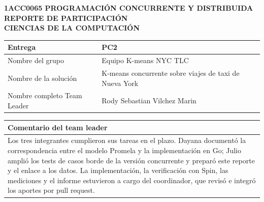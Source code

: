 \documentclass[11pt,a4paper]{article}
\newcommand{\nombreGrupo}{Equipo K-means NYC TLC}
\begin{document}
\begin{center}
\textbf{1ACC0065 PROGRAMACIÓN CONCURRENTE Y DISTRIBUIDA}\\[3pt]
\textbf{REPORTE DE PARTICIPACIÓN}\\[3pt]
\textbf{CIENCIAS DE LA COMPUTACIÓN}
\end{center}

\begin{tabularx}{\textwidth}{|L{5cm}|Y|}\hline
Entrega & PC2 \\\hline
Nombre del grupo & \nombreGrupo \\\hline
Nombre de la solución & K-means concurrente sobre viajes de taxi de Nueva York \\\hline
Nombre completo Team Leader & Rody Sebastian Vilchez Marin \\\hline
\end{tabularx}

\vspace{6pt}
\begin{tabularx}{\textwidth}{|Y|}\hline
\textbf{Comentario del team leader} \\\hline
Los tres integrantes cumplieron sus tareas en el plazo. Dayana documentó la correspondencia entre el modelo Promela y la implementación en Go; Julio amplió los tests de casos borde de la versión concurrente y preparó este reporte y el enlace a los datos. La implementación, la verificación con Spin, las mediciones y el informe estuvieron a cargo del coordinador, que revisó e integró los aportes por pull request. \\\hline
\end{tabularx}
\end{document}
